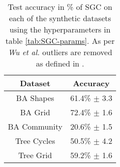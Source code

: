 \begin{table}
    \centering
    \begin{tabular}{c|c}
        \textbf{Dataset} & \textbf{Accuracy} \\
        \midrule
        BA Shapes       & 61.4\% $\pm$ 3.3 \\
        BA Grid         & 72.4\% $\pm$ 1.6 \\
        BA Community    & 20.6\% $\pm$ 1.5 \\
        Tree Cycles     & 50.5\% $\pm$ 4.2 \\
        Tree Grid       & 59.2\% $\pm$ 1.6 \\
    \end{tabular}
    \caption{Test accuracy in \% of SGC on each of the synthetic datasets using the hyperparameters in table \ref{tab:SGC-params}. As per \textit{Wu et al.}\cite{wu2019simplifying} outliers are removed as defined in .}
    \label{tab:SGC-acc}
\end{table}

